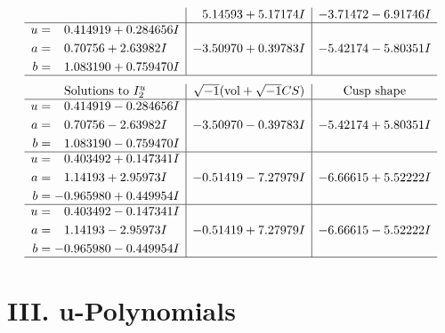 \documentclass[1p]{elsarticle_modified}
\theoremstyle{definition}
\newcommand{\I}{\sqrt{-1}}
\begin{document}
$$\begin{array}{c|c|c}
 & \phantom{-}5.14593 + 5.17174 I & -3.71472 - 6.91746 I \\ \hline\begin{aligned}
u &= \phantom{-}0.414919 + 0.284656 I \\
a &= \phantom{-}0.70756 + 2.63982 I \\
b &= \phantom{-}1.083190 + 0.759470 I\end{aligned}
 & -3.50970 + 0.39783 I & -5.42174 - 5.80351 I\\
 \hline 
 \end{array}$$\newpage$$\begin{array}{c|c|c}  
\text{Solutions to }I^u_{2}& \I (\text{vol} + \sqrt{-1}CS) & \text{Cusp shape}\\
 \hline 
\begin{aligned}
u &= \phantom{-}0.414919 - 0.284656 I \\
a &= \phantom{-}0.70756 - 2.63982 I \\
b &= \phantom{-}1.083190 - 0.759470 I\end{aligned}
 & -3.50970 - 0.39783 I & -5.42174 + 5.80351 I \\ \hline\begin{aligned}
u &= \phantom{-}0.403492 + 0.147341 I \\
a &= \phantom{-}1.14193 + 2.95973 I \\
b &= -0.965980 + 0.449954 I\end{aligned}
 & -0.51419 - 7.27979 I & -6.66615 + 5.52222 I \\ \hline\begin{aligned}
u &= \phantom{-}0.403492 - 0.147341 I \\
a &= \phantom{-}1.14193 - 2.95973 I \\
b &= -0.965980 - 0.449954 I\end{aligned}
 & -0.51419 + 7.27979 I & -6.66615 - 5.52222 I\\
 \hline 
 \end{array}$$\newpage
\newpage\renewcommand{\arraystretch}{1}
\centering \section*{ III. u-Polynomials}
\end{document}

